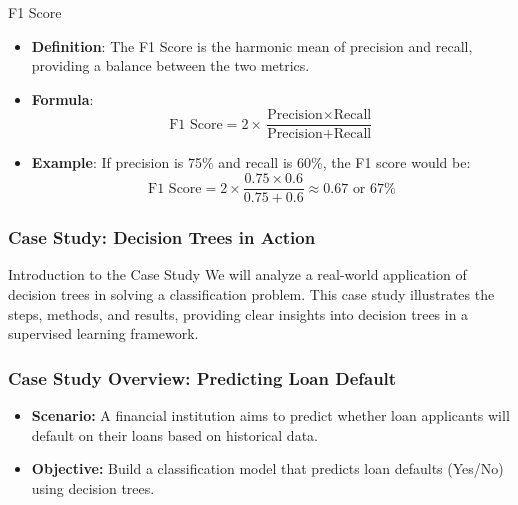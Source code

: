 \documentclass[aspectratio=169]{beamer}
\begin{document}
\begin{frame}[fragile]
    \begin{block}{F1 Score}
        \begin{itemize}
            \item \textbf{Definition}: The F1 Score is the harmonic mean of precision and recall, providing a balance between the two metrics. 
            \item \textbf{Formula}:
            \begin{equation}
            \text{F1 Score} = 2 \times \frac{\text{Precision} \times \text{Recall}}{\text{Precision} + \text{Recall}}
            \end{equation}
            \item \textbf{Example}: If precision is 75\% and recall is 60\%, the F1 score would be:
            \begin{equation}
            \text{F1 Score} = 2 \times \frac{0.75 \times 0.6}{0.75 + 0.6} \approx 0.67 \text{ or } 67\%
            \end{equation}
        \end{itemize}
    \end{block}
\end{frame}

\begin{frame}[fragile]
    \frametitle{Case Study: Decision Trees in Action}
    \begin{block}{Introduction to the Case Study}
        We will analyze a real-world application of decision trees in solving a classification problem. This case study illustrates the steps, methods, and results, providing clear insights into decision trees in a supervised learning framework.
    \end{block}
\end{frame}

\begin{frame}[fragile]
    \frametitle{Case Study Overview: Predicting Loan Default}
    \begin{itemize}
        \item \textbf{Scenario:} A financial institution aims to predict whether loan applicants will default on their loans based on historical data.
        \item \textbf{Objective:} Build a classification model that predicts loan defaults (Yes/No) using decision trees.
    \end{itemize}
\end{frame}
\end{document}
